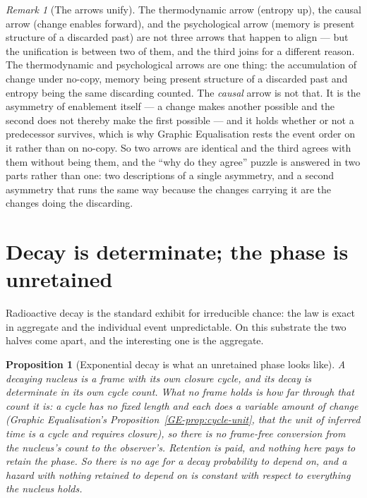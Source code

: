 \documentclass[11pt,a4paper]{article}
\newtheorem{proposition}[definition]{Proposition}
\theoremstyle{remark}\newtheorem{remark}[definition]{Remark}
\begin{document}
\begin{remark}[The arrows unify]\label{rem:arrows}
The thermodynamic arrow (entropy up), the causal arrow (change enables forward),
and the psychological arrow (memory is present structure of a discarded past) are
not three arrows that happen to align --- but the unification is between two of
them, and the third joins for a different reason. The thermodynamic and psychological arrows are one thing: the
accumulation of change under no-copy, memory being present structure of a
discarded past and entropy being the same discarding counted. The \emph{causal}
arrow is not that. It is the asymmetry of enablement itself --- a change makes
another possible and the second does not thereby make the first possible --- and
it holds whether or not a predecessor survives, which is why Graphic Equalisation
rests the event order on it rather than on no-copy. So two arrows are identical
and the third agrees with them without being them, and the ``why do they agree''
puzzle is answered in two parts rather than one: two descriptions of a single
asymmetry, and a second asymmetry that runs the same way because the changes
carrying it are the changes doing the discarding.
\end{remark}

\section{Decay is determinate; the phase is unretained}\label{sec:decay}
Radioactive decay is the standard exhibit for irreducible chance: the law is exact in aggregate and
the individual event unpredictable. On this substrate the two halves come apart, and the interesting
one is the aggregate.

\begin{proposition}[Exponential decay is what an unretained phase looks like]\label{prop:decay}
A decaying nucleus is a frame with its own closure cycle, and its decay is determinate in its own
cycle count. What no frame holds is \emph{how far through that count it is}: a cycle has no fixed
length and each does a variable amount of change (Graphic Equalisation's
Proposition~\ref{GE-prop:cycle-unit}, that the unit of inferred time is a cycle and requires
closure), so there is no frame-free conversion from the
nucleus's count to the observer's. Retention is paid, and nothing here pays to retain the phase.
\emph{So there is no age for a decay probability to depend on}, and a hazard with nothing retained to
depend on is constant \emph{with respect to everything the nucleus holds}.
\end{proposition}
\end{document}
